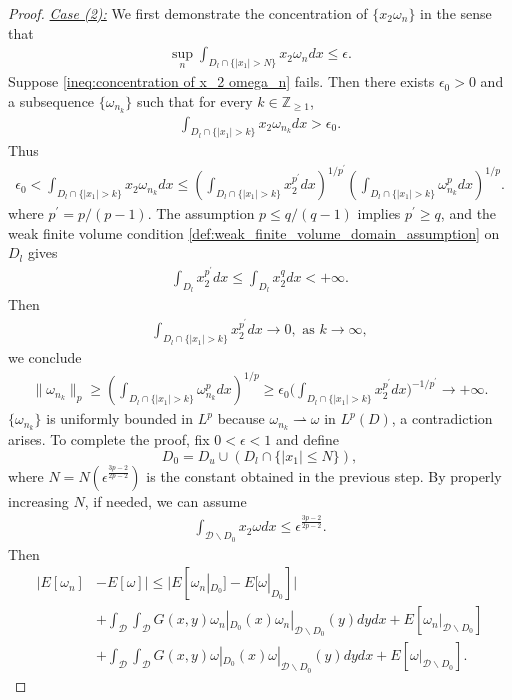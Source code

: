 \documentclass[10pt,a4paper]{amsart}
\newcommand{\D}{\mathcal{D}}
\renewcommand{\tt}[1]{\text{#1}}
\begin{document}
\begin{proof}
    \underline{\textit{Case (2):}} We first demonstrate the concentration of $\{x_2\omega_n\}$ in the sense that
    \begin{align}
        \sup_{n}\int_{D_l \cap \{|x_1|>N\}} x_2 \omega_n dx\leq \epsilon. \label{ineq:concentration of x_2 omega_n}
    \end{align}
    Suppose \eqref{ineq:concentration of x_2 omega_n} fails. Then there exists $\epsilon_0>0$ and a subsequence $\{\omega_{n_k}\}$ such that for every $k \in \mathbb{Z}_{\geq 1}$,
    \begin{align*}
        \int_{D_l \cap \{|x_1|>k\}} x_2 \omega_{n_k} dx > \epsilon_0.
    \end{align*}
    Thus 
    \begin{align*}
        \epsilon_0 < \int_{D_l \cap \{|x_1|>k\}} x_2 \omega_{n_k} dx \leq  \left(\int_{D_l \cap \{|x_1|>k\}} x_2^{p^\prime} dx\right)^{1/p^\prime}\left(\int_{D_l \cap \{|x_1|>k\}} \omega_{n_k}^p dx\right)^{1/p}.
    \end{align*}
    where $p^\prime=p/(p-1) $. The assumption $p \leq q/(q-1)$ implies $p^\prime\geq q$, and the weak finite volume condition \eqref{def:weak_finite_volume_domain_assumption} on $D_l$ gives
    \begin{align*}
        \int_{D_l}x_2^{p^\prime}dx\leq \int_{D_l}x_2^{q}dx <+\infty.
    \end{align*}
    Then 
    \begin{align*}
        \int_{D_l \cap \{|x_1|>k\}} x_2^{p^\prime} dx \rightarrow 0, \tt{ as } k \rightarrow \infty,
    \end{align*}
    we conclude
    \begin{align*}
        \|\omega_{n_k}\|_{p} \geq (\int_{D_l \cap \{|x_1|>k\}} \omega_{n_k}^p dx)^{1/p} \geq \epsilon_0 \Big(\int_{D_l \cap \{|x_1|>k\}} x_2^{p^\prime} dx\Big)^{-1/p^\prime}\rightarrow +\infty.
    \end{align*}
    $\{\omega_{n_k}\}$ is uniformly bounded in $L^p$ because $\omega_{n_k}\rightharpoonup\omega$ in $L^p(D)$, a contradiction arises. 
    To complete the proof, fix $0<\epsilon<1$ and define
    $$
        D_0=D_u\cup(D_l \cap \{|x_1|\leq N\}),
    $$
    where $N=N(\epsilon^{\frac{3p-2}{2p-2}})$ is the constant obtained in the previous step. By properly increasing $N$, if needed, we can assume
    \begin{align*}
        \int_{\D\backslash D_0} x_2\omega dx\leq \epsilon^{\frac{3p-2}{2p-2}}.
    \end{align*}
    Then 
    \begin{align*}
        |E[\omega_n] & - E[\omega]| \leq |E[\omega_n|_{D_0}]-E[\omega|_{D_0}]| \\
        & + \int_{\mathcal{D}}\int_{\mathcal{D}} G(x,y)\omega_n|_{D_0}(x)\omega_n|_{\mathcal{D}\backslash D_0}(y)dydx + E[\omega_n|_{\mathcal{D}\backslash D_0}]\\
        & + \int_{\mathcal{D}}\int_{\mathcal{D}} G(x,y)\omega|_{D_0}(x)\omega|_{\mathcal{D}\backslash D_0}(y)dydx + E[\omega|_{\mathcal{D}\backslash D_0}].
    \end{align*}


\end{proof}
\end{document}

